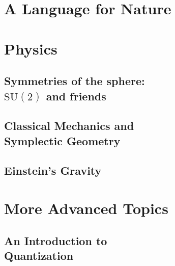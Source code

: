 \documentclass[12pt, twoside, openany]{book}
\newcommand{\1}{\mathbbm{1}}
\theoremstyle{definition}
\begin{document}
\part{A Language for Nature}\thispagestyle{empty}









\part{Physics}\thispagestyle{empty}

\chapter[Symmetries of the sphere: $\mathrm{SU}(2)$ and friends]{Symmetries of the sphere: \\$\mathrm{SU}(2)$ and friends}

\chapter[Classical Mechanics and Symplectic Geometry]{Classical Mechanics and\\ Symplectic Geometry}\label{ch:Symplectic}

\chapter{Einstein's Gravity}\label{ch:GR}

\part{More Advanced Topics}\thispagestyle{empty}

\chapter[An Introduction to Quantization]{An Introduction to \\Quantization}
\end{document}
